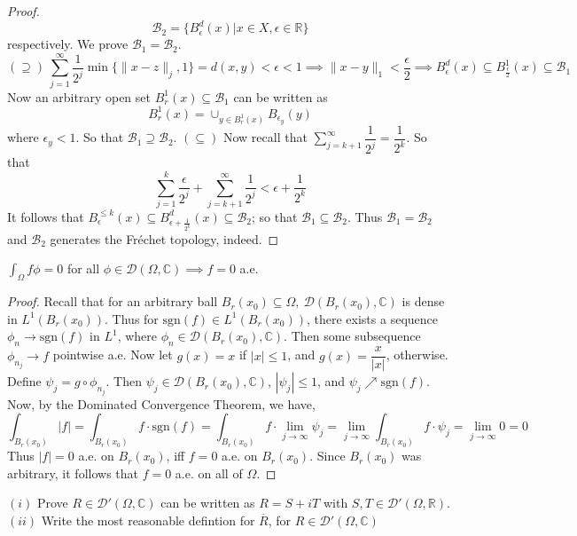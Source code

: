 \documentclass[12pt]{article}
\newenvironment{lemma}[2][Lemma]{\begin{trivlist}
\item[\hskip \labelsep {\bfseries #1}\hskip \labelsep {\bfseries #2.}]}{\end{trivlist}}
\newenvironment{exercise}[2][Exercise]{\begin{trivlist}
\item[\hskip \labelsep {\bfseries #1}\hskip \labelsep {\bfseries #2.}]}{\end{trivlist}}
\begin{document}
\begin{proof}
$$\mathscr{B}_2 = \{B^d_{\epsilon}(x) | x \in X, \epsilon \in \mathbb{R}\}$$
respectively. We prove $\mathscr{B}_1 = \mathscr{B}_2$.
$$(\supseteq)\ \sum_{j=1}^{\infty} \dfrac{1}{2^j} \min\{\|x-z\|_j, 1\} = d(x, y) < \epsilon < 1 \implies \|x - y \|_1 < \dfrac{\epsilon}{2} \implies B^d_{\epsilon}(x) \subseteq B^1_{\frac{\epsilon}{2}}(x) \subseteq \mathscr{B}_1$$
Now an arbitrary open set $B_r^1(x) \subseteq \mathscr{B}_1$ can be  written as $$B_r^1(x) = \cup_{y \in B_r^1(x)}{B_{\epsilon_y}(y)}$$ where $\epsilon_y < 1$. So that $\mathscr{B}_1 \supseteq \mathscr{B}_2$.
$(\subseteq)$ Now recall that $\sum_{j=k+1}^{\infty} \dfrac{1}{2^j} = \dfrac{1}{2^k}$. So that
$$\sum_{j=1}^k \dfrac{\epsilon}{2^j} + \sum_{j=k+1}^{\infty} \dfrac{1}{2^j} < \epsilon + \dfrac{1}{2^k}$$
It follows that $B^{\le k}_{\epsilon}(x) \subseteq B^d_{\epsilon + \frac{1}{2^k}}(x) \subseteq \mathscr{B}_2$; so that $\mathscr{B}_1 \subseteq \mathscr{B}_2$. Thus $\mathscr{B}_1 = \mathscr{B}_2$ and $\mathscr{B}_2$ generates the Fréchet topology, indeed.
\end{proof}

\begin{lemma}{1}
  $\int_{\Omega} f \phi = 0$ for all $\phi \in \mathcal{D}(\Omega, \mathbb{C}) \implies f = 0$ a.e.
\end{lemma}

\begin{proof}
  Recall that for an arbitrary ball $B_r(x_0) \subseteq \Omega,\ \mathcal{D}(B_r(x_0), \mathbb{C})$ is dense in $L^1(B_r(x_0))$. Thus for $\text{sgn}(f) \in L^1(B_r(x_0))$, there exists a sequence $\phi_n \rightarrow \text{sgn}(f)$ in $L^1$, where $\phi_n \in \mathcal{D}(B_r(x_0), \mathbb{C})$. Then some subsequence $\phi_{n_j} \rightarrow f$ pointwise a.e. Now let $g(x) = x$ if $|x| \le 1$, and $g(x) = \dfrac{x}{|x|}$, otherwise. Define $\psi_j = g \circ \phi_{n_j}$. Then $\psi_j \in \mathcal{D}(B_r(x_0), \mathbb{C})$, $|\psi_j| \le 1$, and $\psi_j \nearrow \text{sgn}(f)$. Now, by  the Dominated  Convergence Theorem, we have,
  $$\int_{B_r(x_0)} |f| = \int_{B_r(x_0)} f\cdot \text {sgn}(f) = \int_{B_r(x_0)} f \cdot \lim_{j \rightarrow \infty} \psi_j = \lim_{j \rightarrow \infty} \int_{B_r(x_0)} f \cdot \psi_j =\lim_{j \rightarrow \infty} 0 = 0$$
  Thus $|f| = 0$ a.e. on $B_r(x_0)$, iff $f = 0$ a.e.  on $B_r(x_0)$. Since $B_r(x_0)$ was arbitrary, it follows that $f = 0$ a.e. on all of $\Omega$.
\end{proof}

\begin{exercise}{2}
$(i)$ Prove $R \in \mathcal{D}'(\Omega, \mathbb{C})$ can be written as $R = S + iT$ with $S, T \in \mathcal{D}'(\Omega, \mathbb{R})$.
$(ii)$ Write the most reasonable defintion for $\overline{R}$, for $R \in \mathcal{D}'(\Omega, \mathbb{C})$
\end{exercise}
\end{document}
